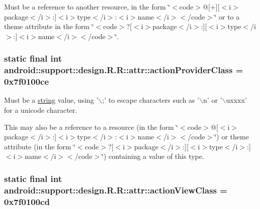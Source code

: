 Must be a reference to another resource, in the form \char`\"{}$<$code$>$@\mbox{[}+\mbox{]}\mbox{[}$<$i$>$package$<$/i$>$:\mbox{]}$<$i$>$type$<$/i$>$:$<$i$>$name$<$/i$>$$<$/code$>$\char`\"{} or to a theme attribute in the form \char`\"{}$<$code$>$?\mbox{[}$<$i$>$package$<$/i$>$:\mbox{]}\mbox{[}$<$i$>$type$<$/i$>$:\mbox{]}$<$i$>$name$<$/i$>$$<$/code$>$\char`\"{}. \hypertarget{classandroid_1_1support_1_1design_1_1_r_1_1attr_35974e4a8ed8dff5b7f0dbabef395ff0}{
\subsubsection[{actionProviderClass}]{\setlength{\rightskip}{0pt plus 5cm}static final int android::support::design.R.R::attr::actionProviderClass = 0x7f0100ce}}
\label{classandroid_1_1support_1_1design_1_1_r_1_1attr_35974e4a8ed8dff5b7f0dbabef395ff0}


Must be a \hyperlink{classandroid_1_1support_1_1design_1_1_r_1_1string}{string} value, using '$\backslash$;' to escape characters such as '$\backslash$n' or '$\backslash$uxxxx' for a unicode character. 

This may also be a reference to a resource (in the form \char`\"{}$<$code$>$@\mbox{[}$<$i$>$package$<$/i$>$:\mbox{]}$<$i$>$type$<$/i$>$:$<$i$>$name$<$/i$>$$<$/code$>$\char`\"{}) or theme attribute (in the form \char`\"{}$<$code$>$?\mbox{[}$<$i$>$package$<$/i$>$:\mbox{]}\mbox{[}$<$i$>$type$<$/i$>$:\mbox{]}$<$i$>$name$<$/i$>$$<$/code$>$\char`\"{}) containing a value of this type. \hypertarget{classandroid_1_1support_1_1design_1_1_r_1_1attr_0d157f6db55ca42538179dc967d74ae3}{
\subsubsection[{actionViewClass}]{\setlength{\rightskip}{0pt plus 5cm}static final int android::support::design.R.R::attr::actionViewClass = 0x7f0100cd}}
\label{classandroid_1_1support_1_1design_1_1_r_1_1attr_0d157f6db55ca42538179dc967d74ae3}


